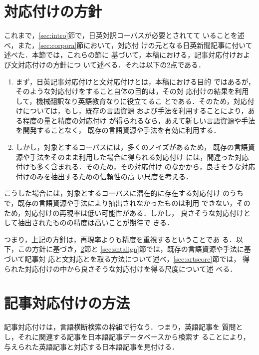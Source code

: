 \section{対応付けの方針}
\label{sec:guideline}

これまで，\ref{sec:intro}節で，日英対訳コーパスが必要とされてて
いることを述べ，また，\ref{sec:corpora}節において，対応付
けの元となる日英新聞記事に付いて述べた．本節では，これらの節に
基づいて，本稿における，記事対応付けおよび文対応付けの方針につ
いて述べる．それは以下の2点である．

\begin{enumerate}
  
\item まず，日英記事対応付けと文対応付けとは，本稿における目的
  ではあるが，そのような対応付けをすること自体の目的は，その対
  応付けの結果を利用して，機械翻訳なり英語教育なりに役立てるこ
  とである．そのため，対応付けについては，もし，既存の言語資源
  および手法を利用することにより，ある程度の量と精度の対応付け
  が得られるなら，あえて新しい言語資源や手法を開発することなく，
  既存の言語資源や手法を有効に利用する．
  
\item しかし，対象とするコーパスには，多くのノイズがあるため，
  既存の言語資源や手法をそのまま利用した場合に得られる対応付け
  には，間違った対応付けも多く含まれる．そのため，その対応付け
  のなかから，良さそうな対応付けのみを抽出するための信頼性の高
  い尺度を考える．
\end{enumerate}
  
こうした場合には，対象とするコーパスに潜在的に存在する対応付け
のうちで，既存の言語資源や手法により抽出されなかったものは利用
できない，そのため，対応付けの再現率は低い可能性がある．しかし，
良さそうな対応付けとして抽出されたものの精度は高いことが期待で
きる．

つまり，上記の方針は，再現率よりも精度を重視するということであ
る．以下，この方針に基づき，\ref{sec:artalign}節と
\ref{sec:sntalign}節では，既存の言語資源や手法に基づいて記事対
応と文対応とを取る方法について述べ，\ref{sec:artscore}節では，
得られた対応付けの中から良さそうな対応付けを得る尺度について述
べる．

\section{記事対応付けの方法}
\label{sec:artalign}

記事対応付けは，言語横断検索の枠組で行なう．つまり，英語記事を
質問とし，それに関連する記事を日本語記事データベースから検索す
ることにより，与えられた英語記事と対応する日本語記事を見付ける．

